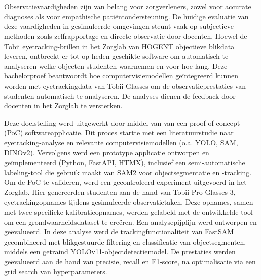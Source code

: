 


\chapter*{}

Observatievaardigheden zijn van belang voor zorgverleners, zowel voor accurate diagnoses als voor empathische patiëntondersteuning. 
De huidige evaluatie van deze vaardigheden in gesimuleerde omgevingen steunt vaak op subjectieve 
methoden zoals zelfrapportage en directe observatie door docenten. 
Hoewel de Tobii eyetracking-brillen in het Zorglab van HOGENT objectieve blikdata leveren, 
ontbreekt er tot op heden geschikte software om automatisch te analyseren welke objecten studenten waarnemen en voor hoe lang. 
Deze bachelorproef beantwoordt hoe computervisiemodellen geïntegreerd kunnen worden met 
eyetrackingdata van Tobii Glasses om de observatieprestaties van studenten automatisch te analyseren.
De analyses dienen de feedback door docenten in het Zorglab te versterken.

Deze doelstelling werd uitgewerkt door middel van van een proof-of-concept (PoC) softwareapplicatie. 
Dit proces startte met een literatuurstudie naar eyetracking-analyse en relevante computervisiemodellen (o.a. YOLO, SAM, DINOv2). 
Vervolgens werd een prototype applicatie ontworpen en geïmplementeerd (Python, FastAPI, HTMX), 
inclusief een semi-automatische labeling-tool die gebruik maakt van SAM2 voor objectsegmentatie en -tracking. 
Om de PoC te valideren, werd een gecontroleerd experiment uitgevoerd in het Zorglab. 
Hier genereerden studenten aan de hand van Tobii Pro Glasses 3, eyetrackingopnames tijdens gesimuleerde observatietaken. 
Deze opnames, samen met twee specifieke kalibratieopnames, werden gelabeld met de ontwikkelde tool om een grondwaarheidsdataset te creëren. 
Een analysepijplijn werd ontworpen en geëvalueerd. In deze analyse werd de trackingfunctionaliteit van FastSAM gecombineerd met 
blikgestuurde filtering en classificatie van objectsegmenten, middels een getraind YOLOv11-objectdetectiemodel. 
De prestaties werden geëvalueerd aan de hand van precisie, recall en F1-score, na optimalisatie via een grid search van hyperparameters.

